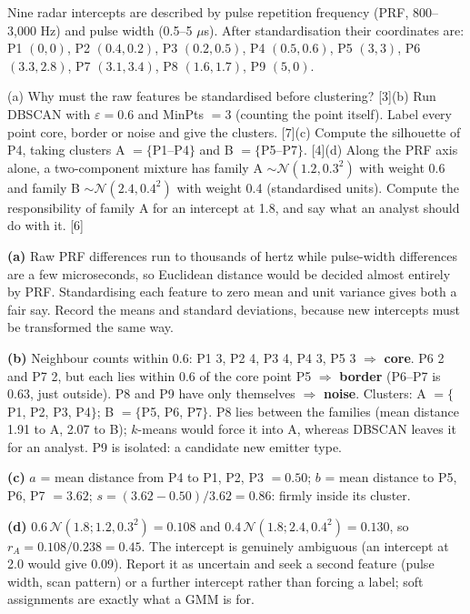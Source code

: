 \documentclass[11pt]{article}
\begin{document}
\begin{prob}Nine radar intercepts are described by pulse repetition frequency (PRF, 800--3,000 Hz) and pulse width (0.5--5 $\mu$s). After standardisation their coordinates are: P1 $(0,0)$, P2 $(0.4,0.2)$, P3 $(0.2,0.5)$, P4 $(0.5,0.6)$, P5 $(3,3)$, P6 $(3.3,2.8)$, P7 $(3.1,3.4)$, P8 $(1.6,1.7)$, P9 $(5,0)$.

(a) Why must the raw features be standardised before clustering? [3]\newline (b) Run DBSCAN with $\varepsilon=0.6$ and MinPts $=3$ (counting the point itself). Label every point core, border or noise and give the clusters. [7]\newline (c) Compute the silhouette of P4, taking clusters A $=\{$P1--P4$\}$ and B $=\{$P5--P7$\}$. [4]\newline (d) Along the PRF axis alone, a two-component mixture has family A $\sim\mathcal N(1.2,0.3^2)$ with weight 0.6 and family B $\sim\mathcal N(2.4,0.4^2)$ with weight 0.4 (standardised units). Compute the responsibility of family A for an intercept at 1.8, and say what an analyst should do with it. [6]\end{prob}

\begin{soln}\textbf{(a)} Raw PRF differences run to thousands of hertz while pulse-width differences are a few microseconds, so Euclidean distance would be decided almost entirely by PRF. Standardising each feature to zero mean and unit variance gives both a fair say. Record the means and standard deviations, because new intercepts must be transformed the same way.

\textbf{(b)} Neighbour counts within 0.6: P1 3, P2 4, P3 4, P4 3, P5 3 $\Rightarrow$ \textbf{core}. P6 2 and P7 2, but each lies within 0.6 of the core point P5 $\Rightarrow$ \textbf{border} (P6--P7 is 0.63, just outside). P8 and P9 have only themselves $\Rightarrow$ \textbf{noise}. Clusters: A $=\{$P1, P2, P3, P4$\}$; B $=\{$P5, P6, P7$\}$. P8 lies between the families (mean distance 1.91 to A, 2.07 to B); $k$-means would force it into A, whereas DBSCAN leaves it for an analyst. P9 is isolated: a candidate new emitter type.

\textbf{(c)} $a$ = mean distance from P4 to P1, P2, P3 $=0.50$; $b$ = mean distance to P5, P6, P7 $=3.62$; $s=(3.62-0.50)/3.62=\mathbf{0.86}$: firmly inside its cluster.

\textbf{(d)} $0.6\,\mathcal N(1.8;1.2,0.3^2)=0.108$ and $0.4\,\mathcal N(1.8;2.4,0.4^2)=0.130$, so $r_A=0.108/0.238=\mathbf{0.45}$. The intercept is genuinely ambiguous (an intercept at 2.0 would give 0.09). Report it as uncertain and seek a second feature (pulse width, scan pattern) or a further intercept rather than forcing a label; soft assignments are exactly what a GMM is for.\end{soln}
\end{document}

